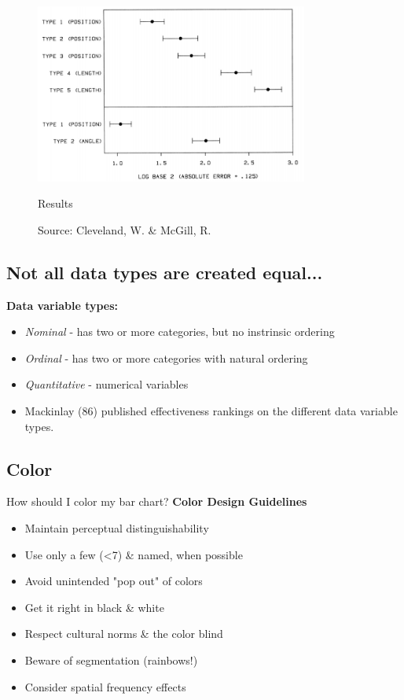 \begin{itemize}
	\begin{figure}[ht]
		\begin{center}
			\includegraphics[width=0.8\textwidth]{figures/cleveland_mcgill_results.png}
			\caption{
				Results}
			\caption*{Source: Cleveland, W. \& McGill, R.}
			\label{fig:cleveland_mcgill_results}
		\end{center}
	\end{figure}
\end{itemize}

\subsection{Not all data types are created equal...}
\textbf{Data variable types:}
\begin{itemize}
	\item \emph{Nominal} - has two or more categories, but no instrinsic ordering
	\item \emph{Ordinal} - has two or more categories with natural ordering
	\item \emph{Quantitative} - numerical variables
	\item Mackinlay (86) published effectiveness rankings on the different data variable types.
\end{itemize}

\subsection{Color}
How should I color my bar chart? 
\newline \newline
\textbf{Color Design Guidelines}
\begin{itemize}
	\item Maintain perceptual distinguishability
	\item Use only a few (<7) \& named, when possible
	\item Avoid unintended "pop out" of colors
	\item Get it right in black \& white
	\item Respect cultural norms \& the color blind
	\item Beware of segmentation (rainbows!)
	\item Consider spatial frequency effects
\end{itemize}

